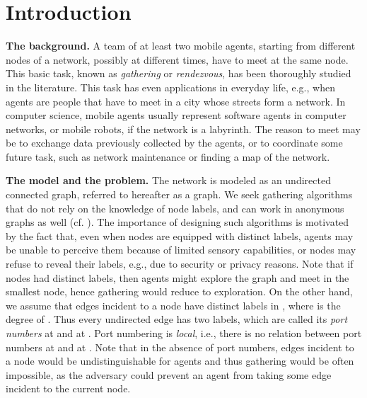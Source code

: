 \documentclass[11pt]{article}
\begin{document}
\vfill



\vfill

\thispagestyle{empty}
\setcounter{page}{0}
\pagebreak


\section{Introduction}


\noindent
{\bf The background.}
A team of at least two mobile agents, starting from different nodes of a network, possibly at different times, have to meet at the same node.
This basic task,  known  as {\em gathering} or {\em rendezvous}, has been thoroughly studied in the literature.
This task has even applications in everyday life, e.g., when agents are people that have to meet in a city whose streets form a network.
In computer science,
mobile agents usually represent software agents in computer networks, or mobile robots, if the network is a labyrinth.
The reason to meet may be to exchange data previously collected by the agents,
or to coordinate some future task, such as network maintenance or finding a map of the network.

\noindent
{\bf The model and the problem.}
The network is modeled as an undirected connected graph, referred to hereafter as a graph. 
We seek gathering algorithms that do not
rely on the knowledge of node labels, and can work in anonymous graphs as well  (cf. \cite{alpern02b}). 
The importance of designing such algorithms
is motivated by the fact that, even when nodes are equipped with distinct labels, agents may be unable to perceive them
because of limited sensory capabilities, 
or nodes may refuse to reveal their labels, e.g., due to security or privacy reasons.
Note that if nodes had distinct labels, then agents might explore the graph and meet in the smallest node, hence gathering would reduce to exploration.
On the other hand, we assume that
edges incident to a node  have distinct labels in 
, where  is the degree of . Thus every undirected
edge  has two labels, which are called its {\em port numbers} at 
and at . Port numbering is {\em local}, i.e., there is no relation between
port numbers at  and at . Note that in the absence of port numbers, edges incident to a node
would be undistinguishable for agents and thus gathering would be often impossible, 
as the adversary could prevent an agent from taking some edge incident to the current node.
\end{document}
